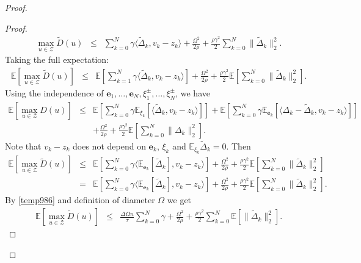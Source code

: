 \documentclass[runningheads]{llncs}
\begin{document}
\begin{proof}
\begin{proof}
\begin{eqnarray*}
     \max_{u \in \mathcal{Z}} \tilde D(u) &\leq& \sum\limits_{k=0}^N \gamma \langle \tilde\Delta_k, v_k - z_k  \rangle + 
    \frac{\Omega^2}{2\rho} + \frac{\rho \gamma^2}{2}\sum\limits_{k=0}^N \|\tilde\Delta_k\|_2^2.  
\end{eqnarray*}
Taking the full expectation: 
\begin{eqnarray*}
    \mathbb{E}\left[\max_{u \in \mathcal{Z}} \tilde D(u)\right] &\leq& \mathbb{E}\left[\sum\limits_{k=1}^N \gamma \langle \tilde\Delta_k, v_k - z_k \rangle\right] + 
    \frac{\Omega^2}{2\rho} + \frac{\rho \gamma^2}{2}\mathbb{E}\left[\sum\limits_{k=0}^N \|\tilde \Delta_k\|_2^2\right].  
\end{eqnarray*}
Using the independence of $\mathbf{e}_1, \ldots, \mathbf{e}_N, \xi^{\pm}_1, \ldots, \xi^{\pm}_N$, we have
\begin{eqnarray*}
    \mathbb{E}\left[\max_{u \in \mathcal{Z}} D(u)\right] &\leq& \mathbb{E}\left[\sum\limits_{k=0}^N \gamma \mathbb{E}_{\xi_k}\left[\langle \tilde\Delta_k, v_k - z_k \rangle\right]\right] + \mathbb{E}\left[\sum\limits_{k=0}^N \gamma \mathbb{E}_{\mathbf{e}_k}\left[\langle \Delta_k - \tilde\Delta_k, v_k - z_k \rangle\right]\right] \nonumber\\ 
       &&+ 
    \frac{\Omega^2}{2\rho} + \frac{\rho \gamma^2}{2}\mathbb{E}\left[\sum\limits_{k=0}^N \|\Delta_k\|_2^2\right]
    .  
\end{eqnarray*}
Note that $v_k - z_k$ does not depend on $\mathbf{e}_k$, $\xi_k$ and $\mathbb{E}_{\xi_k} \tilde\Delta_k = 0$. Then 
\begin{eqnarray*}
    \mathbb{E}\left[\max_{u \in \mathcal{Z}} \tilde D(u)\right] &\leq& \mathbb{E}\left[\sum\limits_{k=0}^N \gamma \langle \mathbb{E}_{\mathbf{e}_k}\left[ \tilde\Delta_k\right], v_k - z_k \rangle\right] +\frac{\Omega^2}{2\rho} + \frac{\rho \gamma^2}{2}\mathbb{E}\left[\sum\limits_{k=0}^N \|\tilde \Delta_k\|_2^2\right]  \nonumber\\ 
    &=& \mathbb{E}\left[\sum\limits_{k=0}^N \gamma \langle \mathbb{E}_{\mathbf{e}_k}\left[\tilde\Delta_k\right], v_k - z_k \rangle\right] + 
    \frac{\Omega^2}{2\rho} + \frac{\rho \gamma^2}{2}\mathbb{E}\left[\sum\limits_{k=0}^N \|\tilde \Delta_k\|_2^2\right].  
\end{eqnarray*}
By \eqref{temp986} and definition of diameter $\Omega$ we get
\begin{eqnarray*}
    \mathbb{E}\left[\max_{u \in \mathcal{Z}} \tilde D(u)\right] &\leq& \frac{\Delta \Omega n}{\tau}\sum\limits_{k=0}^N \gamma + \frac{\Omega^2}{2\rho} + \frac{\rho \gamma^2}{2}\sum\limits_{k=0}^N \mathbb{E}\left[\|\tilde \Delta_k\|_2^2\right].  

\end{eqnarray*}
\end{proof}
\end{proof}
\end{document}

